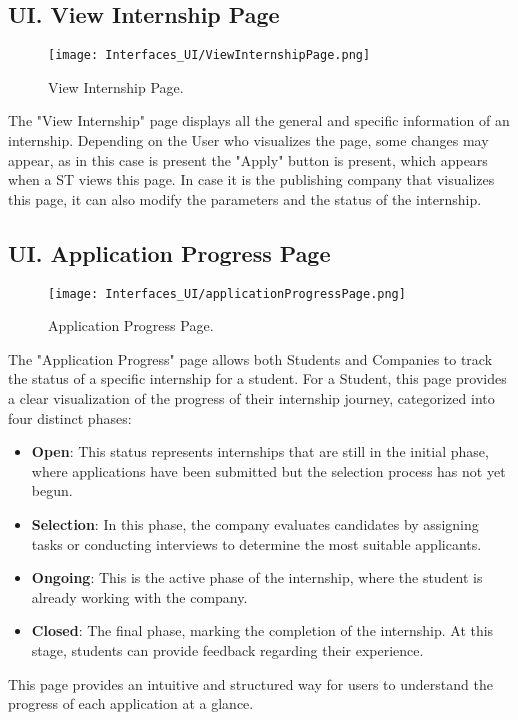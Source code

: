 \subsection*{UI\cui . View Internship Page}

\begin{figure}[H]
    \begin{center}
        \texttt{[image: Interfaces\_UI/ViewInternshipPage.png]}
        \caption{View Internship Page.}
        \label{fig:view_internship_page}%
    \end{center}
\end{figure}

The "View Internship" page displays all the general and specific information of an internship. Depending on the User who visualizes the page, some changes may appear, as in this case is present the "Apply" button is present, which appears when a ST views this page. In case it is the publishing company that visualizes this page, it can also modify the parameters and the status of the internship.

\subsection*{UI\cui . Application Progress Page}

\begin{figure}[H]
    \begin{center}
        \texttt{[image: Interfaces\_UI/applicationProgressPage.png]}
        \caption{Application Progress Page.}
        \label{fig:application_progress_page}%
    \end{center}   
\end{figure}

The "Application Progress" page allows both Students and Companies to track the status of a specific internship for a student. For a Student, this page provides a clear visualization of the progress of their internship journey, categorized into four distinct phases:

\begin{itemize}
    \item \textbf{Open}: This status represents internships that are still in the initial phase, where applications have been submitted but the selection process has not yet begun.
    \item \textbf{Selection}: In this phase, the company evaluates candidates by assigning tasks or conducting interviews to determine the most suitable applicants.
    \item \textbf{Ongoing}: This is the active phase of the internship, where the student is already working with the company.
    \item \textbf{Closed}: The final phase, marking the completion of the internship. At this stage, students can provide feedback regarding their experience.
\end{itemize}
This page provides an intuitive and structured way for users to understand the progress of each application at a glance.

